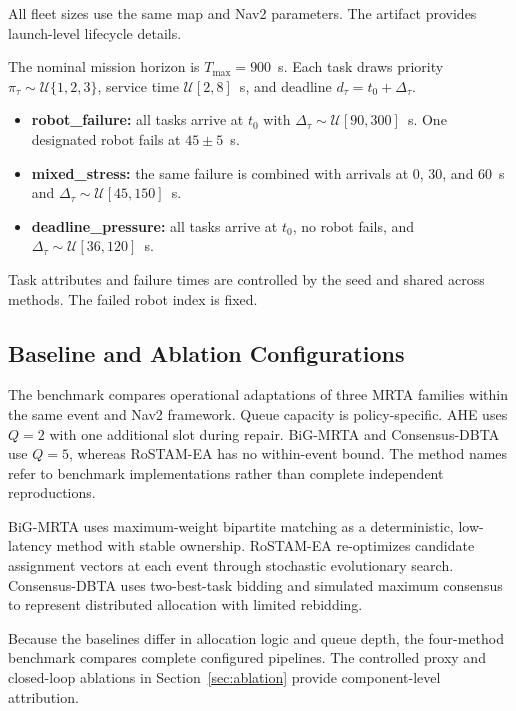 \documentclass[10pt,letterpaper,onecolumn]{IEEEtran}
\begin{document}


All fleet sizes use the same map and Nav2 parameters. The artifact provides
launch-level lifecycle details.

\label{sec:scenarios}
The nominal mission horizon is $T_{\max}=900$~s. Each task draws priority
$\pi_\tau\sim\mathcal U\{1,2,3\}$, service time
$\mathcal U[2,8]$~s, and deadline $d_\tau=t_0+\Delta_\tau$.

\begin{itemize}
  \item \textbf{robot\_failure:} all tasks arrive at $t_0$ with
  $\Delta_\tau\sim\mathcal U[90,300]$~s. One designated robot fails at
  $45\pm5$~s.

  \item \textbf{mixed\_stress:} the same failure is combined with arrivals at
  $0$, $30$, and $60$~s and $\Delta_\tau\sim\mathcal U[45,150]$~s.

  \item \textbf{deadline\_pressure:} all tasks arrive at $t_0$, no robot
  fails, and $\Delta_\tau\sim\mathcal U[36,120]$~s.
\end{itemize}

Task attributes and failure times are controlled by the seed and shared across
methods. The failed robot index is fixed.

\subsection{Baseline and Ablation Configurations}
\label{sec:baselines}
The benchmark compares operational adaptations of three MRTA families within
the same event and Nav2 framework. Queue capacity is policy-specific. AHE uses
$Q=2$ with one additional slot during repair. BiG-MRTA and Consensus-DBTA use
$Q=5$, whereas RoSTAM-EA has no within-event bound. The method names refer to
benchmark implementations rather than complete independent reproductions.

BiG-MRTA \cite{ghassemi2022bigmrta} uses maximum-weight bipartite matching as
a deterministic, low-latency method with stable ownership. RoSTAM-EA
\cite{rostam2024selfadaptive} re-optimizes candidate assignment vectors at
each event through stochastic evolutionary search. Consensus-DBTA
\cite{mahato2023consensus} uses two-best-task bidding and simulated maximum
consensus to represent distributed allocation with limited rebidding.

Because the baselines differ in allocation logic and queue depth, the
four-method benchmark compares complete configured pipelines. The controlled
proxy and closed-loop ablations in Section~\ref{sec:ablation} provide
component-level attribution.
\end{document}
